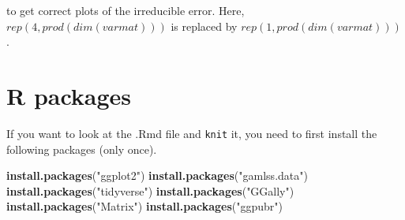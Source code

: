 \documentclass[]{article}
\newenvironment{Shaded}{\begin{snugshade}}{\end{snugshade}}
\newcommand{\KeywordTok}[1]{\textcolor[rgb]{0.13,0.29,0.53}{\textbf{#1}}}
\newcommand{\NormalTok}[1]{#1}
\newcommand{\StringTok}[1]{\textcolor[rgb]{0.31,0.60,0.02}{#1}}
\begin{document}
to get correct plots of the irreducible error. Here,
\(rep(4,prod(dim(varmat)))\) is replaced by
\(rep(1,prod(dim(varmat)))\).

\hypertarget{r-packages}{%
\section{ R packages}\label{r-packages}}

If you want to look at the .Rmd file and \texttt{knit} it, you need to
first install the following packages (only once).

\begin{Shaded}
\begin{Highlighting}[]
\KeywordTok{install.packages}\NormalTok{(}\StringTok{"ggplot2"}\NormalTok{)}
\KeywordTok{install.packages}\NormalTok{(}\StringTok{"gamlss.data"}\NormalTok{)}
\KeywordTok{install.packages}\NormalTok{(}\StringTok{"tidyverse"}\NormalTok{)}
\KeywordTok{install.packages}\NormalTok{(}\StringTok{"GGally"}\NormalTok{)}
\KeywordTok{install.packages}\NormalTok{(}\StringTok{"Matrix"}\NormalTok{)}
\KeywordTok{install.packages}\NormalTok{(}\StringTok{"ggpubr"}\NormalTok{)}
\end{Highlighting}
\end{Shaded}
\end{document}
